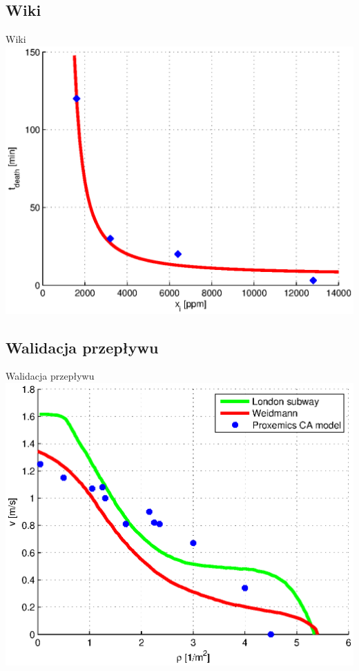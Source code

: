 \subsection{Wiki}
\begin{frame}{Wiki}
\includegraphics[width=\textwidth,height=0.8\textheight,keepaspectratio]{wykresy-wiki}
\end{frame}

\subsection{Walidacja przepływu}
\begin{frame}{Walidacja przepływu}
\includegraphics[width=\textwidth,height=0.8\textheight,keepaspectratio]{wykresy-weidmann_valid}
\end{frame}

